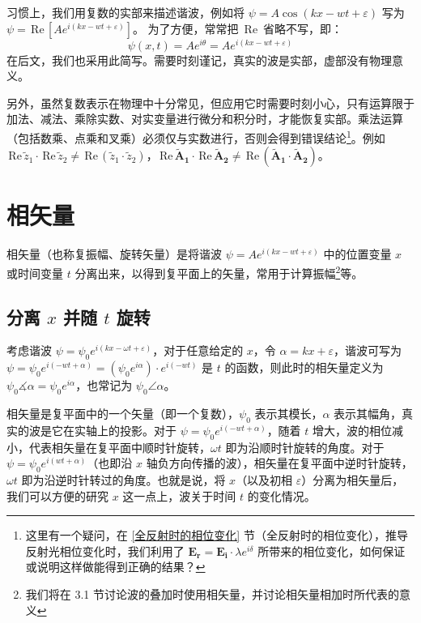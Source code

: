 \documentclass[UTF8]{report}
\def\Re{\mathrm{\,Re}\,}
\theoremstyle{MyLineTheoremStyle} %
\theoremstyle{MyBlockTheoremStyle} %
\theoremstyle{MySubsubsectionStyle} %
\begin{document}
习惯上，我们用复数的实部来描述谐波，例如将 $\psi = A \cos(kx - wt + \varepsilon)$ 写为 $\psi = \Re [A e^{i (kx - wt + \varepsilon)}]$。
为了方便，常常把 $\Re$ 省略不写，即：
\begin{equation}
    \psi(x,t) = A e^{i \theta} = A e^{i (kx - wt + \varepsilon)}
\end{equation}
在后文，我们也采用此简写。需要时刻谨记，真实的波是实部，虚部没有物理意义。

另外，虽然复数表示在物理中十分常见，但应用它时需要时刻小心，只有运算限于加法、减法、乘除实数、对实变量进行微分和积分时，才能恢复实部。乘法运算（包括数乘、点乘和叉乘）必须仅与实数进行，否则会得到错误结论\footnote{这里有一个疑问，在 \ref{全反射时的相位变化} 节（全反射时的相位变化），推导反射光相位变化时，我们利用了 $\boldsymbol{E_r} = \boldsymbol{E_i}\cdot \lambda e^{i \delta} $ 所带来的相位变化，如何保证或说明这样做能得到正确的结果？}。例如 $\Re \tilde{z}_1 \cdot \Re \tilde{z}_2 \ne \Re (\tilde{z}_1\cdot \tilde{z}_2)$，$\Re \boldsymbol{\tilde{A}_1 }\cdot \Re \boldsymbol{\tilde{A}_2 }\ne \Re (\boldsymbol{\tilde{A}_1} \cdot \boldsymbol{\tilde{A}_2})$。

\section{相矢量}\label{相矢量}

相矢量（也称复振幅、旋转矢量）是将谐波 $\psi = A e^{i (kx - wt + \varepsilon)}$ 中的位置变量 $x$ 或时间变量 $t$ 分离出来，以得到复平面上的矢量，常用于计算振幅\footnote{我们将在 3.1 节讨论波的叠加时使用相矢量，并讨论相矢量相加时所代表的意义}等。

\subsection{分离 $x$ 并随 $t$ 旋转}

考虑谐波 $\psi = \psi_0 e^{i(kx - \omega t + \varepsilon)}$，对于任意给定的 $x$，令 $\alpha = kx + \varepsilon$，谐波可写为 $\psi = \psi_0 e^{i(- wt + \alpha)} = (\psi_0 e^{i \alpha})\cdot e^{i(- wt)} $ 是 $t$ 的函数，则此时的相矢量定义为 $ \psi_0 \measuredangle \alpha = \psi_0 e^{i \alpha}$，也常记为 $\psi_0 \angle \alpha$。

相矢量是复平面中的一个矢量（即一个复数），$\psi_0$ 表示其模长，$\alpha$ 表示其幅角，真实的波是它在实轴上的投影。对于 $\psi = \psi_0 e^{i(- wt + \alpha)} $，随着 $t$ 增大，波的相位减小，代表相矢量在复平面中顺时针旋转，$\omega t$ 即为沿顺时针旋转的角度。对于 $\psi = \psi_0 e^{i( wt + \alpha)}$（也即沿 $x$ 轴负方向传播的波），相矢量在复平面中逆时针旋转，$\omega t$ 即为沿逆时针转过的角度。也就是说，将 $x$（以及初相 $\varepsilon$）分离为相矢量后，我们可以方便的研究 $x$ 这一点上，波关于时间 $t$ 的变化情况。
\end{document}
